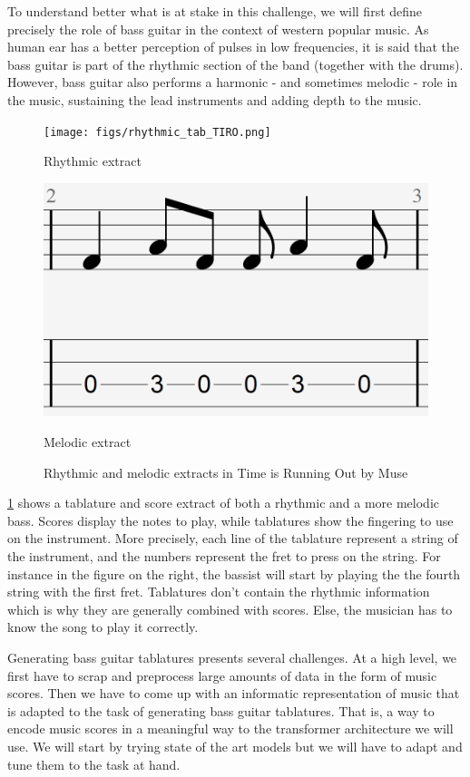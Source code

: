 \documentclass[11pt, a4paper]{article}
\begin{document}
To understand better what is at stake in this challenge, we will first define precisely the role of bass guitar in the context of western popular music.
As human ear has a better perception of pulses in low frequencies,
it is said that the bass guitar is part of the rhythmic section of the band (together with the drums)\cite{hoveSuperiorTimePerception2014}.
However, bass guitar also performs a harmonic - and sometimes melodic - role in the music, sustaining the lead instruments and adding depth to the music.
\begin{figure}[h!]
    \centering
    \begin{minipage}{0.45\textwidth}
        \centering
        \texttt{[image: figs/rhythmic\_tab\_TIRO.png]}
        \caption{Rhythmic extract}
    \end{minipage}%
    \hfill
    \begin{minipage}{0.45\textwidth}
        \centering
        \includegraphics[width=.5\linewidth]{figs/melodic_tab_TIRO.png}
        \caption{Melodic extract}
    \end{minipage}
    \label{fig:bass_tab_TIRO}
    \caption{Rhythmic and melodic extracts in Time is Running Out by Muse}
\end{figure}

\ref{fig:bass_tab_TIRO} shows a tablature and score extract of both a rhythmic and a more melodic bass.
Scores display the notes to play, while tablatures show the fingering to use on the instrument.
More precisely, each line of the tablature represent a string of the instrument, and the numbers represent the fret to press on the string.
For instance in the figure on the right, the bassist will start by playing the the fourth string with the first fret.
Tablatures don't contain the rhythmic information which is why they are generally combined with scores.
Else, the musician has to know the song to play it correctly.


Generating bass guitar tablatures presents several challenges.
At a high level, we first have to scrap and preprocess large amounts of data in the form of music scores.
Then we have to come up with an informatic representation of music that is adapted to the task of generating bass guitar tablatures.
That is, a way to encode music scores in a meaningful way to the transformer architecture we will use.
We will start by trying state of the art models but we will have to adapt and tune them to the task at hand.
\end{document}

